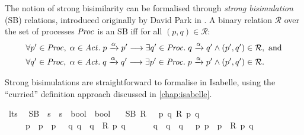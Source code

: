\begin{isabellebody}
\begin{isamarkuptext}
The notion of strong bisimilarity can be formalised through \emph{strong bisimulation} (SB) relations, introduced originally by David Park in \cite{park81}. A binary relation $\mathcal{R}$ over the set of processes $\mathit{Proc}$ is an SB iff for all $(p,q) \in \mathcal{R}$:
\begin{align*}
&\forall p' \in \mathit{Proc},\; \alpha \in \mathit{Act} .\; p \xrightarrow{\alpha} p' \longrightarrow
\exists q' \in \mathit{Proc} .\; q \xrightarrow{\alpha} q' \wedge (p',q') \in \mathcal{R}, \text{ and}\\
&\forall q' \in \mathit{Proc},\; \alpha \in \mathit{Act} .\; q \xrightarrow{\alpha} q' \longrightarrow
\exists p' \in \mathit{Proc} .\; p \xrightarrow{\alpha} p' \wedge (p',q') \in \mathcal{R}.
\end{align*}%
\end{isamarkuptext}\isamarkuptrue%
%
\isadelimdocument
%
\endisadelimdocument
%
\isatagdocument
%
\isamarkuptrue%
%
\endisatagdocument
{\isafolddocument}%
%
\isadelimdocument
%
\endisadelimdocument
%
\begin{isamarkuptext}%
Strong bisimulations are straightforward to formalise in Isabelle, using the \enquote{curried} definition approach discussed in \cref{chap:isabelle}.%
\end{isamarkuptext}\isamarkuptrue%
\isamarkupfalse%
\ lts\ \isanewline
\isanewline
%
\isanewline
{}\isamarkupfalse%
\ SB\ {\isacharcolon}{\kern0pt}{\isacharcolon}{\kern0pt}\ {\isacartoucheopen}{\isacharparenleft}{\kern0pt}{\isacharprime}{\kern0pt}s\ {\isasymRightarrow}\ {\isacharprime}{\kern0pt}s\ {\isasymRightarrow}\ bool{\isacharparenright}{\kern0pt}\ {\isasymRightarrow}\ bool{\isacartoucheclose}\isanewline
\ \ \ {\isacartoucheopen}SB\ R\ {\isasymequiv}\ {\isasymforall}\ p\ q{\isachardot}{\kern0pt}\ R\ p\ q\ {\isasymlongrightarrow}\ \isanewline
\ \ \ \ {\isacharparenleft}{\kern0pt}{\isasymforall}\ p{\isacharprime}{\kern0pt}\ {\isasymalpha}{\isachardot}{\kern0pt}\ p\ {\isasymlongmapsto}{\isasymalpha}\ p{\isacharprime}{\kern0pt}\ {\isasymlongrightarrow}\ {\isacharparenleft}{\kern0pt}{\isasymexists}\ q{\isacharprime}{\kern0pt}{\isachardot}{\kern0pt}\ {\isacharparenleft}{\kern0pt}q\ {\isasymlongmapsto}{\isasymalpha}\ q{\isacharprime}{\kern0pt}{\isacharparenright}{\kern0pt}\ {\isasymand}\ R\ p{\isacharprime}{\kern0pt}\ q{\isacharprime}{\kern0pt}{\isacharparenright}{\kern0pt}{\isacharparenright}{\kern0pt}\ {\isasymand}\isanewline
\ \ \ \ {\isacharparenleft}{\kern0pt}{\isasymforall}\ q{\isacharprime}{\kern0pt}\ {\isasymalpha}{\isachardot}{\kern0pt}\ q\ {\isasymlongmapsto}{\isasymalpha}\ q{\isacharprime}{\kern0pt}\ {\isasymlongrightarrow}\ {\isacharparenleft}{\kern0pt}{\isasymexists}\ p{\isacharprime}{\kern0pt}{\isachardot}{\kern0pt}\ {\isacharparenleft}{\kern0pt}p\ {\isasymlongmapsto}{\isasymalpha}\ p{\isacharprime}{\kern0pt}{\isacharparenright}{\kern0pt}\ {\isasymand}\ R\ p{\isacharprime}{\kern0pt}\ q{\isacharprime}{\kern0pt}{\isacharparenright}{\kern0pt}{\isacharparenright}{\kern0pt}{\isacartoucheclose}%

\end{isabellebody}
